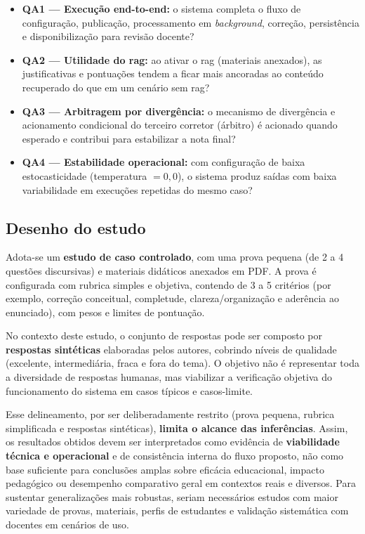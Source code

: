 \begin{itemize}
    \item \textbf{QA1 --- Execução end-to-end:} o sistema completa o fluxo de configuração, publicação, processamento em \textit{background}, correção, persistência e disponibilização para revisão docente?
    \item \textbf{QA2 --- Utilidade do \gls{rag}:} ao ativar o \gls{rag} (materiais anexados), as justificativas e pontuações tendem a ficar mais ancoradas ao conteúdo recuperado do que em um cenário sem \gls{rag}?
    \item \textbf{QA3 --- Arbitragem por divergência:} o mecanismo de divergência e acionamento condicional do terceiro corretor (árbitro) é acionado quando esperado e contribui para estabilizar a nota final?
    \item \textbf{QA4 --- Estabilidade operacional:} com configuração de baixa estocasticidade (temperatura $= 0{,}0$), o sistema produz saídas com baixa variabilidade em execuções repetidas do mesmo caso?
\end{itemize}

\subsection{Desenho do estudo}
Adota-se um \textbf{estudo de caso controlado}, com uma prova pequena (de 2 a 4 questões discursivas) e materiais didáticos anexados em PDF. A prova é configurada com rubrica simples e objetiva, contendo de 3 a 5 critérios (por exemplo, correção conceitual, completude, clareza/organização e aderência ao enunciado), com pesos e limites de pontuação.

No contexto deste estudo, o conjunto de respostas pode ser composto por \textbf{respostas sintéticas} elaboradas pelos autores, cobrindo níveis de qualidade (excelente, intermediária, fraca e fora do tema). O objetivo não é representar toda a diversidade de respostas humanas, mas viabilizar a verificação objetiva do funcionamento do sistema em casos típicos e casos-limite.

Esse delineamento, por ser deliberadamente restrito (prova pequena, rubrica simplificada e respostas sintéticas), \textbf{limita o alcance das inferências}. Assim, os resultados obtidos devem ser interpretados como evidência de \textbf{viabilidade técnica e operacional} e de consistência interna do fluxo proposto, não como base suficiente para conclusões amplas sobre eficácia educacional, impacto pedagógico ou desempenho comparativo geral em contextos reais e diversos. Para sustentar generalizações mais robustas, seriam necessários estudos com maior variedade de provas, materiais, perfis de estudantes e validação sistemática com docentes em cenários de uso.


